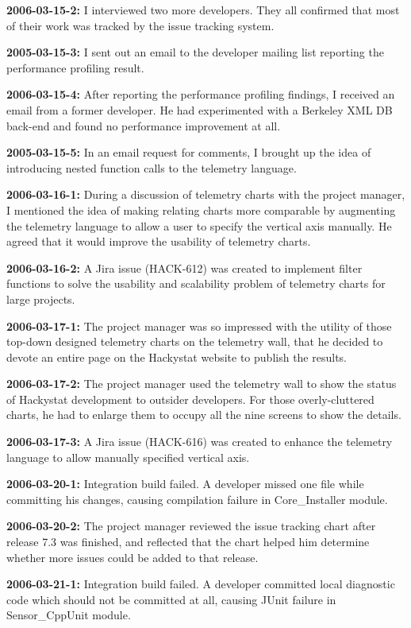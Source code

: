 \textbf{2006-03-15-2:}
I interviewed two more developers. They all confirmed that most of their work was tracked by the issue tracking system.

\textbf{2005-03-15-3:}
I sent out an email to the developer mailing list reporting the performance profiling result.

\textbf{2006-03-15-4:}
After reporting the performance profiling findings, I received an email from a former developer. He had experimented with a Berkeley XML DB back-end and found no performance improvement at all.

\textbf{2005-03-15-5:}
In an email request for comments, I brought up the idea of introducing nested function calls to the telemetry language.

\textbf{2006-03-16-1:}
During a discussion of telemetry charts with the project manager, I mentioned the idea of making relating charts more comparable by augmenting the telemetry language to allow a user to specify the vertical axis manually. He agreed that it would improve the usability of telemetry charts. 

\textbf{2006-03-16-2:}
A Jira issue (HACK-612) was created to implement filter functions to solve the usability and scalability problem of telemetry charts for large projects.

\textbf{2006-03-17-1:}
The project manager was so impressed with the utility of those top-down designed telemetry charts on the telemetry wall, that he decided to devote an entire page on the Hackystat website to publish the results.

\textbf{2006-03-17-2:}
The project manager used the telemetry wall to show the status of Hackystat development to outsider developers. For those overly-cluttered charts, he had to enlarge them to occupy all the nine screens to show the details.

\textbf{2006-03-17-3:}
A Jira issue (HACK-616) was created to enhance the telemetry language to allow manually specified vertical axis.

\textbf{2006-03-20-1:}
Integration build failed. A developer missed one file while committing his changes, causing compilation failure in Core\_Installer module.

\textbf{2006-03-20-2:}
The project manager reviewed the issue tracking chart after release 7.3 was finished, and reflected that the chart helped him determine whether more issues could be added to that release. 

\textbf{2006-03-21-1:}
Integration build failed. A developer committed local diagnostic code which should not be committed at all, causing JUnit failure in Sensor\_CppUnit module.

